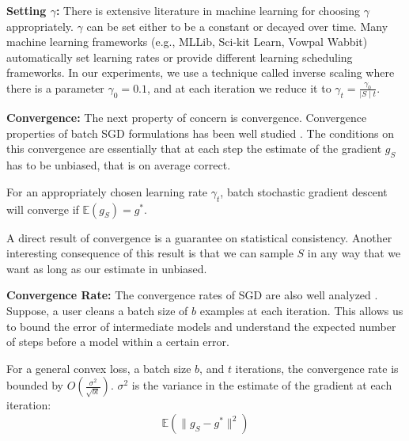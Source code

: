\vspace{0.5em}

\noindent\textbf{ Setting $\gamma$: } There is extensive literature in machine learning for choosing $\gamma$ appropriately. $\gamma$ can be set either to be a constant or decayed over time. Many machine learning frameworks (e.g., MLLib, Sci-kit Learn, Vowpal Wabbit) automatically set learning rates or provide different learning scheduling frameworks. 
In our experiments, we use a technique called inverse scaling where there is a parameter $\gamma_0=0.1$, and at each iteration we reduce it to $\gamma_t = \frac{\gamma_0}{\mid S \mid t}$. 

\vspace{0.5em}

\noindent\textbf{ Convergence: } The next property of concern is convergence. Convergence properties of batch SGD formulations has been well studied \cite{dekel2012optimal}. 
The conditions on this convergence are essentially that at each step the estimate of the gradient $g_S$ has to be unbiased, that is on average correct. 

\begin{proposition}
For an appropriately chosen learning rate $\gamma_t$, batch stochastic gradient descent will converge if $\mathbb{E}(g_S)=g^*$.
\label{unbiased}
\end{proposition}

A direct result of convergence is a guarantee on statistical consistency.
Another interesting consequence of this result is that we can sample $S$ in any way that we want
as long as our estimate in unbiased.

\vspace{0.5em}

\noindent\textbf{ Convergence Rate: } The convergence rates of SGD are also well analyzed \cite{dekel2012optimal,bertsekas2011incremental,zhao2014stochastic}. 
Suppose, a user cleans a batch size of $b$ examples at each iteration.
This allows us to bound the error of intermediate models and understand the expected number of steps before a model within a certain error. 

\begin{proposition}
For a general convex loss, a batch size $b$, and $t$ iterations, the convergence rate is bounded by $O(\frac{\sigma^2}{\sqrt{bt}})$. 
$\sigma^2$ is the variance in the estimate of the gradient at each iteration:
\[
\mathbb{E}(\|g_S - g^*\|^2)
\]
\end{proposition}

